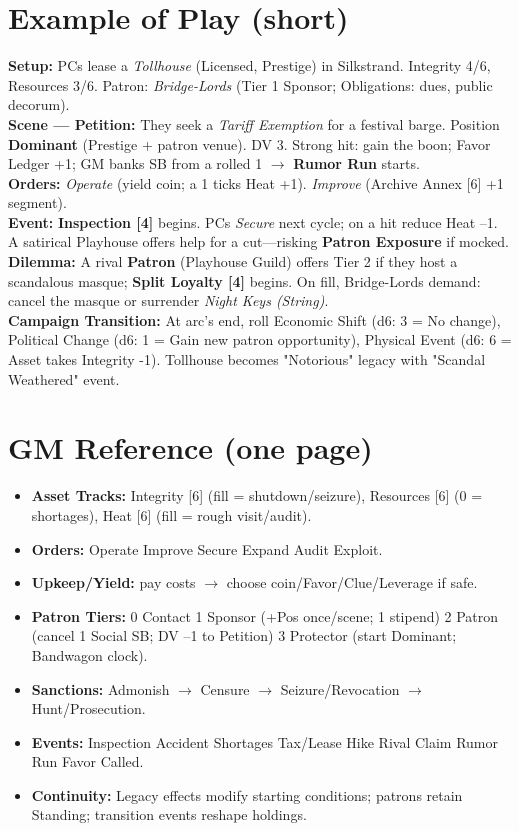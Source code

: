 \documentclass[11pt]{article}
\begin{document}
\section{Example of Play (short)}
\textbf{Setup:} PCs lease a \emph{Tollhouse} (Licensed, Prestige) in Silkstrand. Integrity 4/6, Resources 3/6. Patron: \emph{Bridge-Lords} (Tier 1 Sponsor; Obligations: dues, public decorum).\\
\textbf{Scene --- Petition:} They seek a \emph{Tariff Exemption} for a festival barge. Position \textbf{Dominant} (Prestige + patron venue). DV 3. Strong hit: gain the boon; Favor Ledger +1; GM banks SB from a rolled 1 $\to$ \textbf{Rumor Run} starts.\\
\textbf{Orders:} \emph{Operate} (yield coin; a 1 ticks Heat +1). \emph{Improve} (Archive Annex [6] +1 segment).\\
\textbf{Event:} \textbf{Inspection [4]} begins. PCs \emph{Secure} next cycle; on a hit reduce Heat --1. A satirical Playhouse offers help for a cut---risking \textbf{Patron Exposure} if mocked.\\
\textbf{Dilemma:} A rival \textbf{Patron} (Playhouse Guild) offers Tier 2 if they host a scandalous masque; \textbf{Split Loyalty [4]} begins. On fill, Bridge-Lords demand: cancel the masque or surrender \emph{Night Keys (String)}.\\
\textbf{Campaign Transition:} At arc's end, roll Economic Shift (d6: 3 = No change), Political Change (d6: 1 = Gain new patron opportunity), Physical Event (d6: 6 = Asset takes Integrity -1). Tollhouse becomes "Notorious" legacy with "Scandal Weathered" event.

\section*{GM Reference (one page)}
\begin{itemize}
  \item \textbf{Asset Tracks:} Integrity [6] (fill = shutdown/seizure), Resources [6] (0 = shortages), Heat [6] (fill = rough visit/audit).
  \item \textbf{Orders:} Operate \textbullet{} Improve \textbullet{} Secure \textbullet{} Expand \textbullet{} Audit \textbullet{} Exploit.
  \item \textbf{Upkeep/Yield:} pay costs $\to$ choose coin/Favor/Clue/Leverage if safe.
  \item \textbf{Patron Tiers:} 0 Contact \textbullet{} 1 Sponsor (+Pos once/scene; 1 stipend) \textbullet{} 2 Patron (cancel 1 Social SB; DV --1 to Petition) \textbullet{} 3 Protector (start Dominant; Bandwagon clock).
  \item \textbf{Sanctions:} Admonish $\to$ Censure $\to$ Seizure/Revocation $\to$ Hunt/Prosecution.
  \item \textbf{Events:} Inspection \textbullet{} Accident \textbullet{} Shortages \textbullet{} Tax/Lease Hike \textbullet{} Rival Claim \textbullet{} Rumor Run \textbullet{} Favor Called.
  \item \textbf{Continuity:} Legacy effects modify starting conditions; patrons retain Standing; transition events reshape holdings.
\end{itemize}
\end{document}
